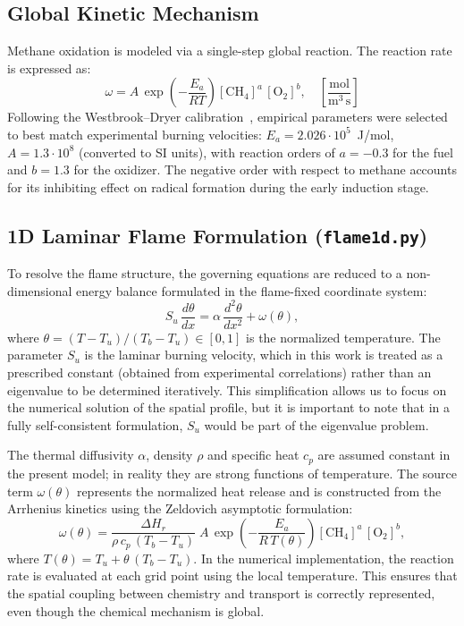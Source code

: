 \documentclass[11pt,a4paper]{article}
\begin{document}
\subsection{Global Kinetic Mechanism}
Methane oxidation is modeled via a single-step global reaction. The reaction rate is expressed as:
\begin{equation}
  \omega = A\,\exp\!\left(-\frac{E_a}{R T}\right)
           [\mathrm{CH_4}]^{a}\,[\mathrm{O_2}]^{b}, \quad \left[\frac{\mathrm{mol}}{\mathrm{m^3\,s}}\right]
  \label{eq:rate}
\end{equation}
Following the Westbrook--Dryer calibration~\cite{westbrook}, empirical parameters were selected to best match
experimental burning velocities: $E_a = 2.026\cdot 10^5$~J/mol, $A = 1.3\cdot 10^8$ (converted to SI units),
with reaction orders of $a = -0.3$ for the fuel and $b = 1.3$ for the oxidizer. The negative order with
respect to methane accounts for its inhibiting effect on radical formation during the early induction stage.

\subsection{1D Laminar Flame Formulation (\texttt{flame1d.py})}
\label{sec:flame1d}
To resolve the flame structure, the governing equations are reduced to a non-dimensional energy balance
formulated in the flame-fixed coordinate system:
\begin{equation}
  S_u\,\frac{d\theta}{dx}
  = \alpha\,\frac{d^2\theta}{dx^2} + \omega(\theta),
  \label{eq:flame}
\end{equation}
where $\theta=(T-T_u)/(T_b-T_u) \in [0,1]$ is the normalized temperature. The parameter $S_u$ is the
laminar burning velocity, which in this work is treated as a prescribed constant (obtained from
experimental correlations) rather than an eigenvalue to be determined iteratively. This simplification
allows us to focus on the numerical solution of the spatial profile, but it is important to note that
in a fully self-consistent formulation, $S_u$ would be part of the eigenvalue problem.

The thermal diffusivity $\alpha$, density $\rho$ and specific heat $c_p$ are assumed constant in the
present model; in reality they are strong functions of temperature. The source term $\omega(\theta)$
represents the normalized heat release and is constructed from the Arrhenius kinetics using the
Zeldovich asymptotic formulation:
\begin{equation}
  \omega(\theta) = \frac{\Delta H_r}{\rho\,c_p\,(T_b-T_u)}\;
  A\,\exp\!\left(-\frac{E_a}{R\,T(\theta)}\right)
  [\mathrm{CH_4}]^{a}\,[\mathrm{O}_2]^{b},
\end{equation}
where $T(\theta) = T_u + \theta\,(T_b-T_u)$. In the numerical implementation, the reaction rate is
evaluated at each grid point using the local temperature. This ensures that the spatial coupling
between chemistry and transport is correctly represented, even though the chemical mechanism is
global.
\end{document}
